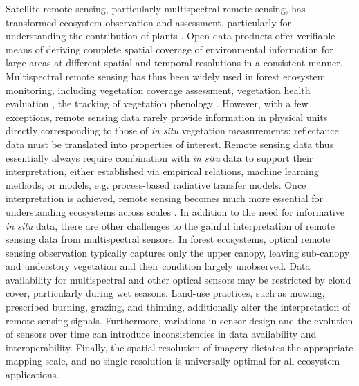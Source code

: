 \documentclass[pdflatex,sn-mathphys-num]{sn-jnl}%
\theoremstyle{thmstyleone}%
\theoremstyle{thmstyletwo}%
\theoremstyle{thmstylethree}%
\begin{document}
Satellite remote sensing, particularly multispectral remote sensing, has transformed ecosystem observation and assessment, particularly for understanding the contribution of plants \cite{andrew2014potential,pettorelli2018satellite}. 
Open data products offer verifiable means of deriving complete spatial coverage of environmental information for large areas at different spatial and temporal resolutions in a consistent manner. Multispectral remote sensing has thus been widely used in forest ecosystem monitoring, including vegetation coverage assessment, vegetation health evaluation \cite{zarco2019chlorophyll,brown2025grounded,cherif2022deepforest}, the tracking of vegetation phenology \cite{dronova2022remote}. However, with a few exceptions, remote sensing data rarely provide information in physical units directly corresponding to those of \textit{in situ} vegetation measurements: reflectance data must be translated into properties of interest. Remote sensing data thus essentially always require combination with \textit{in situ} data to support their interpretation, either established via empirical relations, machine learning methods, or models, e.g. process-based radiative transfer models. Once interpretation is achieved, remote sensing becomes much more essential for understanding ecosystems across scales \cite{cavender2025spectral}. 
In addition to the need for informative \textit{in situ} data, there are other challenges to the gainful interpretation of remote sensing data from multispectral sensors. In forest ecosystems, optical remote sensing observation typically captures only the upper canopy, leaving sub-canopy and understory vegetation and their condition largely unobserved. Data availability for multispectral and other optical sensors may be restricted by cloud cover, particularly during wet seasons. Land-use practices, such as mowing, prescribed burning, grazing, and thinning, additionally alter the interpretation of remote sensing signals. Furthermore, variations in sensor design and the evolution of sensors over time can introduce inconsistencies in data availability and interoperability. Finally, the spatial resolution of imagery dictates the appropriate mapping scale, and no single resolution is universally optimal for all ecosystem applications.
\end{document}
